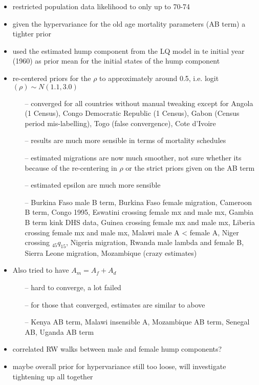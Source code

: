 \documentclass[12pt,a4paper]{article}
\date{\vspace{-5ex}}
\begin{document}
\begin{itemize}
\item restricted population data likelihood to only up to 70-74
\item given the hypervariance for the old age mortality parameters (AB term) a tighter prior
\item used the estimated hump component from the LQ model in te initial year (1960) as prior mean for the initial states of the hump component
\item re-centered priors for the $\rho$ to approximately around 0.5, i.e. logit$(\rho) \sim N(1.1, 3.0)$
	\begin{itemize}
	\item[--] converged for all countries without manual tweaking except for Angola (1 Census), Congo Democratic Republic (1 Census), Gabon (Census period mis-labelling), Togo (false convergence), Cote d'Ivoire
	\item[--] results are much more sensible in terms of mortality schedules
	\item[--] estimated migrations are now much smoother, not sure whether its because of the re-centering in $\rho$ or the strict priors given on the AB term
	\item[--] estimated epsilon are much more sensible
	\item[--] Burkina Faso male B term, Burkina Faso female migration, Cameroon B term, Congo 1995, Eswatini crossing female mx and male mx, Gambia B term kink DHS data, Guinea crossing female mx and male mx, Liberia crossing female mx and male mx, Malawi male A < female A,
	Niger crossing $_{45}q_{15}$, Nigeria migration, Rwanda male lambda and female B, Sierra Leone migration, Mozambique (crazy estimates)
	\end{itemize}

\item Also tried to have $A_m = A_f + A_d$
	\begin{itemize}
	\item[--] hard to converge, a lot failed
	\item[--] for those that converged, estimates are similar to above
	\item[--] Kenya AB term, Malawi insensible A, Mozambique AB term, Senegal AB, Uganda AB term
	\end{itemize}

\item correlated RW walks between male and female hump components?
\item maybe overall prior for hypervariance still too loose, will investigate tightening up all together
\end{itemize}
\end{document}
